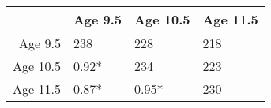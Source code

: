 \begin{table}[ht]
\centering
\begin{tabular}{rlll}
  \hline
 & Age 9.5 & Age 10.5 & Age 11.5 \\ 
  \hline
Age 9.5 & 238 & 228 & 218 \\ 
  Age 10.5 &  0.92*  & 234 & 223 \\ 
  Age 11.5 &  0.87*  &  0.95*  & 230 \\ 
   \hline
\end{tabular}
\end{table}

